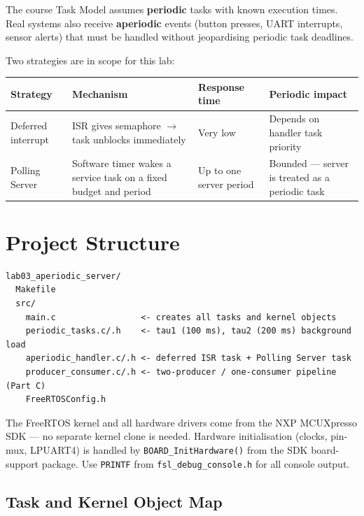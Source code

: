 \documentclass[11pt, a4paper]{article}
\begin{document}
The course Task Model assumes \textbf{periodic} tasks with known execution times. Real systems
also receive \textbf{aperiodic} events (button presses, UART interrupts, sensor alerts) that
must be handled without jeopardising periodic task deadlines.

Two strategies are in scope for this lab:

\renewcommand{\arraystretch}{1.3}
\begin{tabular}{@{} p{3.0cm} p{3.5cm} p{3.5cm} p{3.5cm} @{}}
  \toprule
  \textbf{Strategy} & \textbf{Mechanism} & \textbf{Response time} & \textbf{Periodic impact} \\
  \midrule
  Deferred interrupt &
    ISR gives semaphore $\to$ task unblocks immediately &
    Very low &
    Depends on handler task priority \\
  Polling Server &
    Software timer wakes a service task on a fixed budget and period &
    Up to one server period &
    Bounded --- server is treated as a periodic task \\
  \bottomrule
\end{tabular}
\renewcommand{\arraystretch}{1}

\section{Project Structure}

\begin{lstlisting}[style=textstyle]
lab03_aperiodic_server/
  Makefile
  src/
    main.c                 <- creates all tasks and kernel objects
    periodic_tasks.c/.h    <- tau1 (100 ms), tau2 (200 ms) background load
    aperiodic_handler.c/.h <- deferred ISR task + Polling Server task
    producer_consumer.c/.h <- two-producer / one-consumer pipeline (Part C)
    FreeRTOSConfig.h
\end{lstlisting}

\begin{warnbox}
  The FreeRTOS kernel and all hardware drivers come from the NXP MCUXpresso SDK ---
  no separate kernel clone is needed. Hardware initialisation (clocks, pin-mux,
  LPUART4) is handled by \texttt{BOARD\_InitHardware()} from the SDK board-support
  package. Use \texttt{PRINTF} from \texttt{fsl\_debug\_console.h} for all console output.
\end{warnbox}

\subsection{Task and Kernel Object Map}
\end{document}
